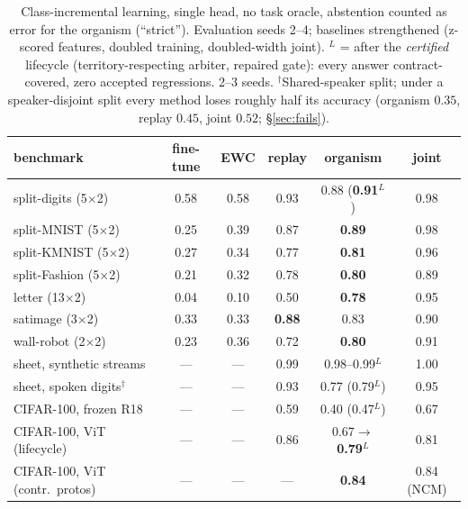 \documentclass{article}
\begin{document}
\begin{table}[t]
\centering
\caption{Class-incremental learning, single head, no task oracle, abstention
counted as error for the organism (``strict''). Evaluation seeds 2--4;
baselines strengthened (z-scored features, doubled training, doubled-width
joint). $^{L}$ = after the \emph{certified} lifecycle (territory-respecting
arbiter, repaired gate): every answer contract-covered, zero accepted
regressions. 2--3 seeds. $^{\dagger}$Shared-speaker split; under a speaker-disjoint
split every method loses roughly half its accuracy (organism $0.35$, replay $0.45$,
joint $0.52$; \S\ref{sec:fails}).}
\label{tab:main}
\small
\begin{tabular}{lccccc}
\toprule
benchmark & fine-tune & EWC & replay & \textbf{organism} & joint \\
\midrule
split-digits (5$\times$2) & 0.58 & 0.58 & 0.93 & 0.88 (\textbf{0.91}$^{L}$) & 0.98\\
split-MNIST (5$\times$2) & 0.25 & 0.39 & 0.87 & \textbf{0.89} & 0.98\\
split-KMNIST (5$\times$2) & 0.27 & 0.34 & 0.77 & \textbf{0.81} & 0.96\\
split-Fashion (5$\times$2) & 0.21 & 0.32 & 0.78 & \textbf{0.80} & 0.89\\
letter (13$\times$2) & 0.04 & 0.10 & 0.50 & \textbf{0.78} & 0.95\\
satimage (3$\times$2) & 0.33 & 0.33 & \textbf{0.88} & 0.83 & 0.90\\
wall-robot (2$\times$2) & 0.23 & 0.36 & 0.72 & \textbf{0.80} & 0.91\\
sheet, synthetic streams & --- & --- & 0.99 & 0.98--0.99$^{L}$ & 1.00\\
sheet, spoken digits$^{\dagger}$ & --- & --- & 0.93 & 0.77 (0.79$^{L}$) & 0.95\\
CIFAR-100, frozen R18 & --- & --- & 0.59 & 0.40 (0.47$^{L}$) & 0.67\\
CIFAR-100, ViT (lifecycle) & --- & --- & 0.86 & 0.67$\to$\textbf{0.79}$^{L}$ & 0.81\\
CIFAR-100, ViT (contr.\ protos) & --- & --- & --- & \textbf{0.84} & 0.84 (NCM)\\
\bottomrule
\end{tabular}
\end{table}
\end{document}
